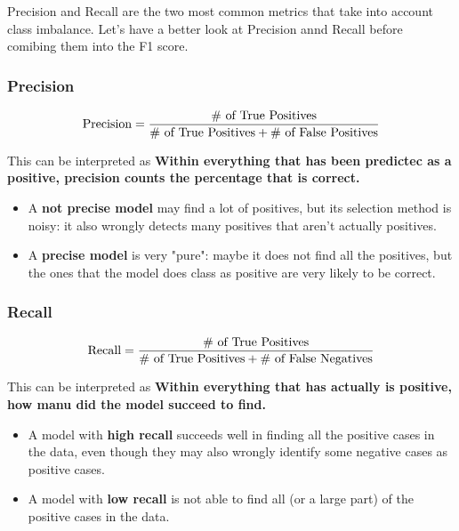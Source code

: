 Precision and Recall are the two most common metrics that take into
account class imbalance. Let's have a better look at Precision annd
Recall before comibing them into the F1 score.

\hypertarget{precision}{%
\subsubsection{Precision}\label{precision}}

\begin{align*}
\textnormal{Precision} = \frac{\# \textnormal{ of  True Positives}}{\# \textnormal{ of True Positives} + \# \textnormal{ of False Positives}}
\end{align*}

This can be interpreted as \textbf{Within everything that has been
predictec as a positive, precision counts the percentage that is
correct.}

\begin{itemize}
\item
  A \textbf{not precise model} may find a lot of positives, but its
  selection method is noisy: it also wrongly detects many positives that
  aren't actually positives.
\item
  A \textbf{precise model} is very "pure": maybe it does not find all
  the positives, but the ones that the model does class as positive are
  very likely to be correct.
\end{itemize}

\hypertarget{recall}{%
\subsubsection{Recall}\label{recall}}

\begin{align*}
\textnormal{Recall} = \frac{\# \textnormal{ of  True Positives}}{\# \textnormal{ of True Positives} + \# \textnormal{ of False Negatives}}
\end{align*}

This can be interpreted as \textbf{Within everything that has actually
is positive, how manu did the model succeed to find.}

\begin{itemize}
\item
  A model with \textbf{high recall} succeeds well in finding all the
  positive cases in the data, even though they may also wrongly identify
  some negative cases as positive cases.
\item
  A model with \textbf{low recall} is not able to find all (or a large
  part) of the positive cases in the data.
\end{itemize}


